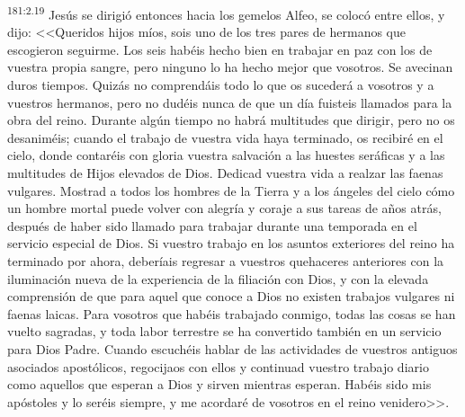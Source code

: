 \par 
\textsuperscript{181:2.19} Jesús se dirigió entonces hacia los gemelos Alfeo, se colocó entre ellos, y dijo: <<Queridos hijos míos, sois uno de los tres pares de hermanos que escogieron seguirme. Los seis habéis hecho bien en trabajar en paz con los de vuestra propia sangre, pero ninguno lo ha hecho mejor que vosotros. Se avecinan duros tiempos. Quizás no comprendáis todo lo que os sucederá a vosotros y a vuestros hermanos, pero no dudéis nunca de que un día fuisteis llamados para la obra del reino. Durante algún tiempo no habrá multitudes que dirigir, pero no os desaniméis; cuando el trabajo de vuestra vida haya terminado, os recibiré en el cielo, donde contaréis con gloria vuestra salvación a las huestes seráficas y a las multitudes de Hijos elevados de Dios. Dedicad vuestra vida a realzar las faenas vulgares. Mostrad a todos los hombres de la Tierra y a los ángeles del cielo cómo un hombre mortal puede volver con alegría y coraje a sus tareas de años atrás, después de haber sido llamado para trabajar durante una temporada en el servicio especial de Dios. Si vuestro trabajo en los asuntos exteriores del reino ha terminado por ahora, deberíais regresar a vuestros quehaceres anteriores con la iluminación nueva de la experiencia de la filiación con Dios, y con la elevada comprensión de que para aquel que conoce a Dios no existen trabajos vulgares ni faenas laicas. Para vosotros que habéis trabajado conmigo, todas las cosas se han vuelto sagradas, y toda labor terrestre se ha convertido también en un servicio para Dios Padre. Cuando escuchéis hablar de las actividades de vuestros antiguos asociados apostólicos, regocijaos con ellos y continuad vuestro trabajo diario como aquellos que esperan a Dios y sirven mientras esperan. Habéis sido mis apóstoles y lo seréis siempre, y me acordaré de vosotros en el reino venidero>>.

